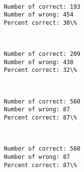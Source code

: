 \documentclass[11pt]{article}
\begin{document}
    \begin{center}
    \end{center}
    { \hspace*{\fill} \\}
    
    \begin{Verbatim}[commandchars=\\\{\}]
Number of correct: 193
Number of wrong: 454
Percent correct: 30\%

    \end{Verbatim}

    \begin{center}
    \end{center}
    { \hspace*{\fill} \\}
    
    \begin{Verbatim}[commandchars=\\\{\}]
Number of correct: 209
Number of wrong: 438
Percent correct: 32\%

    \end{Verbatim}

    \begin{center}
    \end{center}
    { \hspace*{\fill} \\}
    
    \begin{Verbatim}[commandchars=\\\{\}]
Number of correct: 560
Number of wrong: 87
Percent correct: 87\%

    \end{Verbatim}

    \begin{center}
    \end{center}
    { \hspace*{\fill} \\}
    
    \begin{Verbatim}[commandchars=\\\{\}]
Number of correct: 560
Number of wrong: 87
Percent correct: 87\%

    \end{Verbatim}
\end{document}
